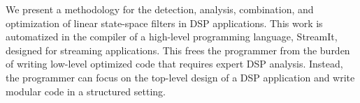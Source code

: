 
    We present a methodology for the detection, analysis, combination, and
optimization of linear state-space filters in DSP applications.
This work is automatized in the compiler of a high-level
programming language, StreamIt, designed for streaming
applications. This frees the programmer from the burden of writing
low-level optimized code that requires expert DSP analysis.
Instead, the programmer can focus on the top-level design of a DSP
application and write modular code in a structured setting.






